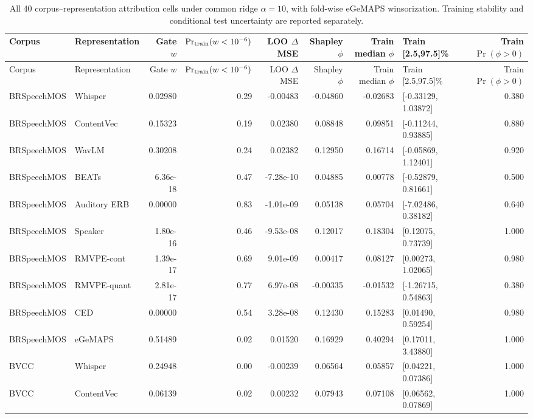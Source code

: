 \begingroup
\scriptsize
\setlength{\tabcolsep}{3pt}
\begin{longtable}{llrrrrrlr}
\caption{All 40 corpus--representation attribution cells under common ridge $\alpha=10$, with fold-wise eGeMAPS winsorization. Training stability and conditional test uncertainty are reported separately.}\label{tab:attribution-evidence}\\
\toprule
Corpus & Representation & Gate $w$ & $\Pr_{\rm train}(w<10^{-6})$ & LOO $\Delta$MSE & Shapley $\phi$ & Train median $\phi$ & Train [2.5,97.5]\% & Train $\Pr(\phi>0)$ \\
\midrule
\endfirsthead
\toprule
Corpus & Representation & Gate $w$ & $\Pr_{\rm train}(w<10^{-6})$ & LOO $\Delta$MSE & Shapley $\phi$ & Train median $\phi$ & Train [2.5,97.5]\% & Train $\Pr(\phi>0)$ \\
\midrule
\endhead
\bottomrule
\endfoot
BRSpeechMOS & Whisper & 0.02980 & 0.29 & -0.00483 & -0.04860 & -0.02683 & [-0.33129, 1.03872] & 0.380 \\
BRSpeechMOS & ContentVec & 0.15323 & 0.19 & 0.02380 & 0.08848 & 0.09851 & [-0.11244, 0.93885] & 0.880 \\
BRSpeechMOS & WavLM & 0.30208 & 0.24 & 0.02382 & 0.12950 & 0.16714 & [-0.05869, 1.12401] & 0.920 \\
BRSpeechMOS & BEATs & 6.36e-18 & 0.47 & -7.28e-10 & 0.04885 & 0.00778 & [-0.52879, 0.81661] & 0.500 \\
BRSpeechMOS & Auditory ERB & 0.00000 & 0.83 & -1.01e-09 & 0.05138 & 0.05704 & [-7.02486, 0.38182] & 0.640 \\
BRSpeechMOS & Speaker & 1.80e-16 & 0.46 & -9.53e-08 & 0.12017 & 0.18304 & [0.12075, 0.73739] & 1.000 \\
BRSpeechMOS & RMVPE-cont & 1.39e-17 & 0.69 & 9.01e-09 & 0.00417 & 0.08127 & [0.00273, 1.02065] & 0.980 \\
BRSpeechMOS & RMVPE-quant & 2.81e-17 & 0.77 & 6.97e-08 & -0.00335 & -0.01532 & [-1.26715, 0.54863] & 0.380 \\
BRSpeechMOS & CED & 0.00000 & 0.54 & 3.28e-08 & 0.12430 & 0.15283 & [0.01490, 0.59254] & 0.980 \\
BRSpeechMOS & eGeMAPS & 0.51489 & 0.02 & 0.01520 & 0.16929 & 0.40294 & [0.17011, 3.43880] & 1.000 \\
BVCC & Whisper & 0.24948 & 0.00 & -0.00239 & 0.06564 & 0.05857 & [0.04221, 0.07386] & 1.000 \\
BVCC & ContentVec & 0.06139 & 0.02 & 0.00232 & 0.07943 & 0.07108 & [0.06562, 0.07869] & 1.000 \\

\end{longtable}
